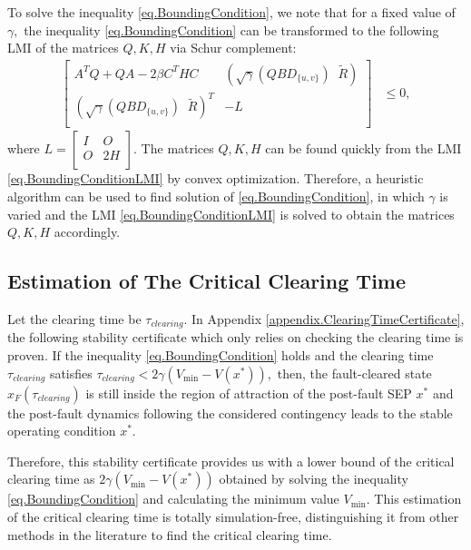 \documentclass[final]{IEEEtran}
\begin{document}
To solve the inequality \eqref{eq.BoundingCondition}, we note that
for a fixed value of $\gamma,$ the inequality
\eqref{eq.BoundingCondition} can be transformed to the following
LMI of the matrices $Q,K,H$ via Schur complement:
\begin{align}
\label{eq.BoundingConditionLMI}
    \left[   \begin{array}{ccccc}
          A^TQ+QA-2\beta C^THC   & (\sqrt{\gamma}(QBD_{\{u,v\}}) \;\; \tilde{R}) \\
          (\sqrt{\gamma}(QBD_{\{u,v\}}) \;\;\tilde{R})^T  & -L\\
        \end{array}\right] &\le 0,
  \end{align}
  where $L=\left[   \begin{array}{ccccc}
          I   & O \\
          O  & 2H\\
        \end{array}\right].$
The matrices $Q,K,H$ can be found quickly from the LMI
\eqref{eq.BoundingConditionLMI} by convex optimization. Therefore,
a heuristic algorithm can be used to find solution of
\eqref{eq.BoundingCondition}, in which $\gamma$ is varied and 
the LMI \eqref{eq.BoundingConditionLMI} is solved to obtain the
matrices $Q,K,H$ accordingly.

\subsection{Estimation of The Critical Clearing Time}
\label{sec.EstimationCCT}

Let the clearing time be $\tau_{clearing}.$ In Appendix
\ref{appendix.ClearingTimeCertificate}, the following
stability certificate which only relies on checking the clearing
time is proven. If the inequality \eqref{eq.BoundingCondition} holds and the
clearing time $\tau_{clearing}$ satisfies $\tau_{clearing}<
2\gamma (V_{\min}-V(x^*)),$  then, the fault-cleared state
$x_F(\tau_{clearing})$ is still inside the region of attraction of
the post-fault SEP $x^*$ and the post-fault dynamics following the
considered contingency leads to the stable operating condition
$x^*$. 

Therefore, this stability certificate provides us with a lower bound of the critical clearing
time as $2\gamma (V_{\min}-V(x^*))$ obtained by solving the inequality
\eqref{eq.BoundingCondition} and calculating the minimum value
$V_{\min}.$ This estimation of the critical clearing time is
totally simulation-free,  distinguishing it from other methods
in the literature to find the critical clearing time.
\end{document}
